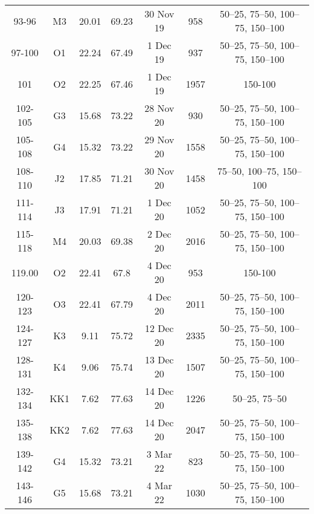 \documentclass{article}
\begin{document}
\begin{table}[htbp]
{\begin{adjustwidth}{0in}{0in}
\begin{tabular}{ccccccc}
				93-96         & M3  & 20.01      & 69.23      & 30 Nov 19                 & 958        & 50–25, 75–50, 100–75, 150–100 \\
				97-100        & O1  & 22.24      & 67.49      & 1 Dec 19                  & 937        & 50–25, 75–50, 100–75, 150–100 \\
				101        & O2  & 22.25      & 67.46      & 1 Dec 19                  & 1957       & 150-100                       \\
				\midrule
				102-105       & G3  & 15.68      & 73.22      & 28 Nov 20                 & 930        & 50–25, 75–50, 100–75, 150–100 \\
				105-108       & G4  & 15.32      & 73.22      & 29 Nov 20                 & 1558       & 50–25, 75–50, 100–75, 150–100 \\
				108-110       & J2  & 17.85      & 71.21      & 30 Nov 20                 & 1458       & 75–50, 100–75, 150–100        \\
				111-114       & J3  & 17.91      & 71.21      & 1 Dec 20                  & 1052       & 50–25, 75–50, 100–75, 150–100 \\
				115-118       & M4  & 20.03      & 69.38      & 2 Dec 20                  & 2016       & 50–25, 75–50, 100–75, 150–100 \\
				119.00        & O2  & 22.41      & 67.8       & 4 Dec 20                  & 953        & 150-100                       \\
				120-123       & O3  & 22.41      & 67.79      & 4 Dec 20                  & 2011       & 50–25, 75–50, 100–75, 150–100 \\
				124-127       & K3  & 9.11       & 75.72      & 12 Dec 20                 & 2335       & 50–25, 75–50, 100–75, 150–100 \\
				128-131       & K4  & 9.06       & 75.74      & 13 Dec 20                 & 1507       & 50–25, 75–50, 100–75, 150–100 \\
				132-134       & KK1 & 7.62       & 77.63      & 14 Dec 20                 & 1226       & 50–25, 75–50                  \\
				135-138       & KK2 & 7.62       & 77.63      & 14 Dec 20                 & 2047       & 50–25, 75–50, 100–75, 150–100 \\
				\midrule
				139-142       & G4  & 15.32      & 73.21      & 3 Mar 22                  & 823        & 50–25, 75–50, 100–75, 150–100 \\
				143-146       & G5  & 15.68      & 73.21      & 4 Mar 22                  & 1030       & 50–25, 75–50, 100–75, 150–100 \\

\end{tabular}
\end{adjustwidth}}
\end{table}
\end{document}
